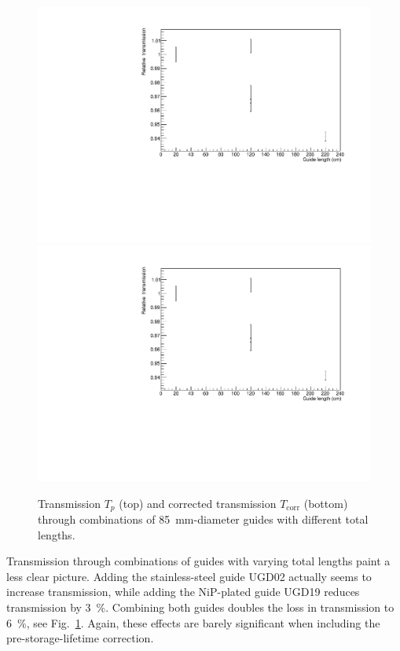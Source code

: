 \documentclass[10pt,letterpaper]{article}
\begin{document}
\begin{figure}
\centering
\includegraphics[width=\textwidth,page=1]{../transmission_with_prestorage/transmission.pdf}
\includegraphics[width=\textwidth,page=2]{../transmission_with_prestorage/transmission.pdf}
\caption{Transmission $T_p$ (top) and corrected transmission $T_\mathrm{corr}$ (bottom) through combinations of \SI{85}{\milli\meter}-diameter guides with different total lengths.}
\label{fig:transmissionlength}
\end{figure}

Transmission through combinations of guides with varying total lengths paint a less clear picture. Adding the stainless-steel guide UGD02 actually seems to increase transmission, while adding the NiP-plated guide UGD19 reduces transmission by \SI{3}{\percent}. Combining both guides doubles the loss in transmission to \SI{6}{\percent}, see Fig.~\ref{fig:transmissionlength}. Again, these effects are barely significant when including the pre-storage-lifetime correction.
\end{document}
